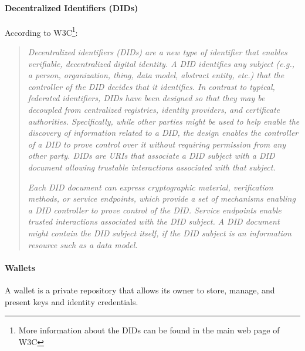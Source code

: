 \documentclass[a4paper, 12pt]{article} %
\begin{document}
                \paragraph{Decentralized Identifiers (DIDs)}
                    According to W3C\cite{w3c-did}\footnote{More information about the DIDs can be found in the main web page of W3C\cite{w3c-did}}:
                    \begin{quote}
                        \textit{Decentralized identifiers (DIDs) are a new type of identifier that enables verifiable, decentralized digital identity. A DID identifies any subject (e.g., a person, organization, thing, data model, abstract entity, etc.) that the controller of the DID decides that it identifies. In contrast to typical, federated identifiers, DIDs have been designed so that they may be decoupled from centralized registries, identity providers, and certificate authorities. Specifically, while other parties might be used to help enable the discovery of information related to a DID, the design enables the controller of a DID to prove control over it without requiring permission from any other party. DIDs are URIs that associate a DID subject with a DID document allowing trustable interactions associated with that subject.}
                        
                        \textit{Each DID document can express cryptographic material, verification methods, or service endpoints, which provide a set of mechanisms enabling a DID controller to prove control of the DID. Service endpoints enable trusted interactions associated with the DID subject. A DID document might contain the DID subject itself, if the DID subject is an information resource such as a data model.}
                    \end{quote}
                    
                \paragraph{Wallets}
                    A wallet\cite{ssi-wallets} is a private repository that allows its owner to store, manage, and present keys and identity credentials.\\
                    
\end{document}
